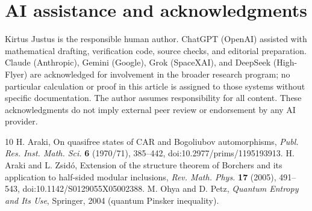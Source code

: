 \documentclass[11pt]{article}
\theoremstyle{definition}
\begin{document}
\section*{AI assistance and acknowledgments}
Kirtus Justus is the responsible human author. ChatGPT (OpenAI) assisted with mathematical drafting, verification code, source checks, and editorial preparation. Claude (Anthropic), Gemini (Google), Grok (SpaceXAI), and DeepSeek (High-Flyer) are acknowledged for involvement in the broader research program; no particular calculation or proof in this article is assigned to those systems without specific documentation. The author assumes responsibility for all content. These acknowledgments do not imply external peer review or endorsement by any AI provider.

\begin{thebibliography}{10}
 H. Araki, On quasifree states of CAR and Bogoliubov automorphisms, \emph{Publ. Res. Inst. Math. Sci.} \textbf{6} (1970/71), 385--442, doi:10.2977/prims/1195193913.
 H. Araki and L. Zsid\'o, Extension of the structure theorem of Borchers and its application to half-sided modular inclusions, \emph{Rev. Math. Phys.} \textbf{17} (2005), 491--543, doi:10.1142/S0129055X05002388.
 M. Ohya and D. Petz, \emph{Quantum Entropy and Its Use}, Springer, 2004 (quantum Pinsker inequality).
\end{thebibliography}
\end{document}

